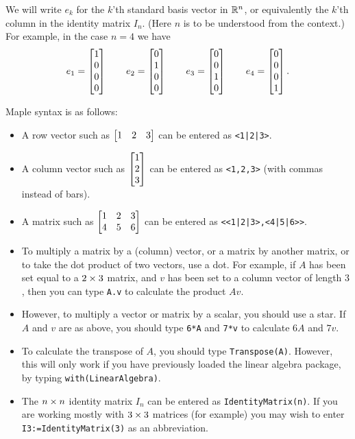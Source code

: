 \documentclass[reqno]{amsart}
\theoremstyle{definition}
\newcommand{\idx}[1]{{#1}\index{#1}}
\begin{document}
We will write $e_k$ for the $k$'th \idx{standard basis vector} in ${\mathbb{R}}^n$, or
equivalently the $k$'th column in the identity matrix $I_n$.  (Here
$n$ is to be understood from the context.)  For example, in the case
$n=4$ we have
\[ e_1 = \left[\begin{matrix} 1 \\ 0 \\ 0 \\ 0 \end{matrix}\right] \qquad
   e_2 = \left[\begin{matrix} 0 \\ 1 \\ 0 \\ 0 \end{matrix}\right] \qquad
   e_3 = \left[\begin{matrix} 0 \\ 0 \\ 1 \\ 0 \end{matrix}\right] \qquad
   e_4 = \left[\begin{matrix} 0 \\ 0 \\ 0 \\ 1 \end{matrix}\right].
\]

\idx{Maple} syntax is as follows:
\begin{itemize}
 \item A row vector such as $\left[\begin{matrix} 1 & 2 & 3 \end{matrix}\right]$ can be entered as
  \verb+<1|2|3>+.
 \item A column vector such as $\left[\begin{matrix} 1\\2\\3\end{matrix}\right]$ can be entered as
  \verb+<1,2,3>+ (with commas instead of bars).
 \item A matrix such as $\left[\begin{matrix} 1&2&3\\4&5&6\end{matrix}\right]$ can be entered as 
  \verb+<<1|2|3>,<4|5|6>>+.
 \item To multiply a matrix by a (column) vector, or a matrix by
  another matrix, or to take the dot product of two vectors, use a
  dot.  For example, if $A$ has been set equal to a $2\times 3$ matrix,
  and $v$ has been set to a column vector of length $3$, then you can
  type \verb+A.v+ to calculate the product $Av$.
 \item However, to multiply a vector or matrix by a scalar, you should
  use a star.  If $A$ and $v$ are as above, you should type \verb+6*A+
  and \verb+7*v+ to calculate $6A$ and $7v$.
 \item To calculate the transpose of $A$, you should type
  \verb+Transpose(A)+.  However, this will only work if you have
  previously loaded the linear algebra package, by typing
  \verb+with(LinearAlgebra)+. 
 \item The $n\times n$ identity matrix $I_n$ can be entered as
  \verb+IdentityMatrix(n)+.  If you are working mostly with $3\times 3$
  matrices (for example) you may wish to enter \verb+I3:=IdentityMatrix(3)+
  as an abbreviation.  
\end{itemize}
\end{document}

